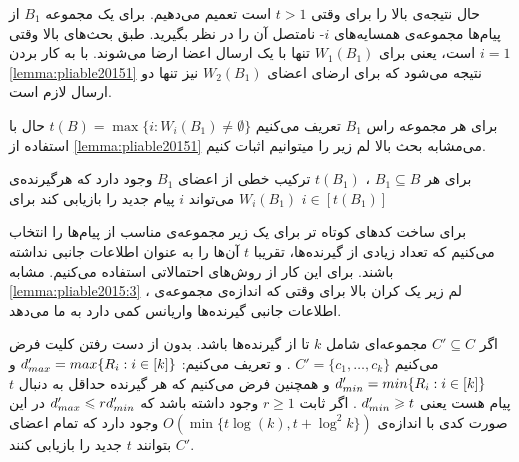حال نتیجه‌ی بالا را برای 
وقتی
$t > 1$
است تعمیم می‌دهیم. برای یک مجموعه
$B_1$
از پیام‌ها مجموعه‌ی همسایه‌های
$i$-
نامتصل آن را در نظر بگیرید. طبق بحث‌های بالا وقتی
$i = 1$
است، یعنی برای
$W_1(B_1)$
تنها با یک ارسال اعضا ارضا می‌شوند. با به کار بردن
\autoref{lemma:pliable20151}
نتیجه می‌شود که برای ارضای اعضای
$W_2(B_1)$
نیز تنها دو ارسال لازم است.

\begin{example}
	
\end{example}

برای هر مجموعه‌ راس
$B_1$
تعریف می‌کنیم 
$t(B) = \max\{i: W_i(B_1) \neq \emptyset \}$
حال با استفاده از
\autoref{lemma:pliable20151}
می‌مشابه بحث بالا لم زیر را میتوانیم اثبات کنیم.
\begin{lemma}
	برای هر
	$B_1 \subseteq B$
	، 
	$t(B_1)$
	ترکیب خطی از اعضای
	 $B_1$
	 وجود دارد که هرگیرنده‌ی
	 $W_i(B_1)$
	 می‌تواند
	 $i$
	 پیام جدید را بازیابی کند برای
	 $i \in [t(B_1)]$
\end{lemma}
	برای ساخت کدهای کوتاه تر برای
یک زیر مجموعه‌ی مناسب از پیام‌ها را انتخاب می‌کنیم که تعداد زیادی از گیرنده‌ها، تقریبا
$t$
آن‌ها را به عنوان اطلاعات جانبی نداشته باشند. برای این کار از روش‌های احتمالاتی استفاده می‌کنیم. مشابه
\autoref{lemma:pliable2015:3}
، لم زیر یک کران بالا برای وقتی که اندازه‌ی مجموعه‌ی اطلاعات جانبی گیرنده‌ها واریانس کمی دارد به ما می‌دهد.
\begin{lemma}
	\label{lemma:pliable2015:6}
	اگر
	$C' \subseteq C$
	مجموعه‌ای شامل 
	$k$
	تا از گیرنده‌‌ها باشد. بدون از دست رفتن کلیت فرض می‌کنیم
	$C' = \{c_1, \ldots, c_k\}$
	. و تعریف می‌کنیم:
	$d_{max}' = max\{R_i: i \in [k] \}$
	و
	$d_{min}' = min\{R_i: i \in [k] \}$
	و همچنین فرض می‌کنیم که هر گیرنده حداقل به دنبال 
	$t$
	 پیام هست یعنی
	$d_{min}' \geqslant t$
	. اگر ثابت
	$r \geq 1$
	وجود داشته باشد که
	$d_{max}' \leqslant r d_{min}'$
	در این صورت کدی با اندازه‌ی
	$O(\min\{t \log(k), t + \log^2 k\})$
	وجود دارد که تمام اعضای
	$C'$
	بتوانند
	$t$
	جدید را بازیابی کنند.
\end{lemma}

